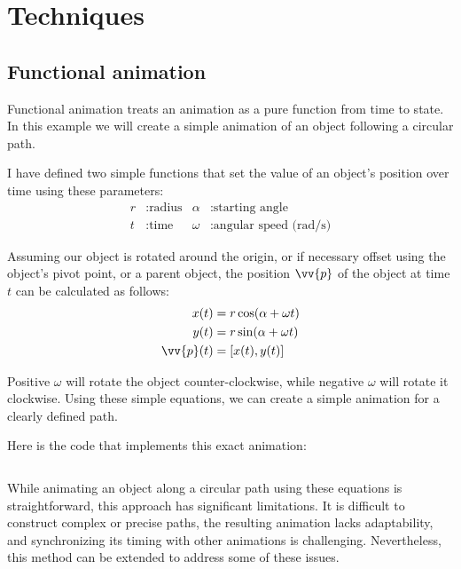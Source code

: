 \pagebreak

\section{Techniques}
\label{sec:techniques}

\subsection{Functional animation}
\label{subsec:functional-animation}

Functional animation treats an animation as a pure function from time to state. In this example we will create a simple animation of an object following a circular path.


I have defined two simple functions that set the value of an object's position over time using these parameters:
\begin{align*}
    r &: \text{radius} & \alpha &: \text{starting angle} \\
    t &: \text{time} & \omega &: \text{angular speed (rad/s)}
\end{align*}

Assuming our object is rotated around the origin, or if necessary offset using the object's pivot point, or a parent object, the position \(\vv{p}\) of the object at time \(t\) can be calculated as follows:
\begin{align*}
    x(t) &= r\cos(\alpha + \omega t) \\
    y(t) &= r\sin(\alpha + \omega t) \\
    \vv{p}(t) &= [x(t), y(t)]
\end{align*}

Positive \(\omega\) will rotate the object counter-clockwise, while negative \(\omega\) will rotate it clockwise. Using these simple equations, we can create a simple animation for a clearly defined path.

Here is the code that implements this exact animation:
\inputminted{typescript}{code/functional-animation.tex}

While animating an object along a circular path using these equations is straightforward, this approach has significant limitations. It is difficult to construct complex or precise paths, the resulting animation lacks adaptability, and synchronizing its timing with other animations is challenging. Nevertheless, this method can be extended to address some of these issues.

